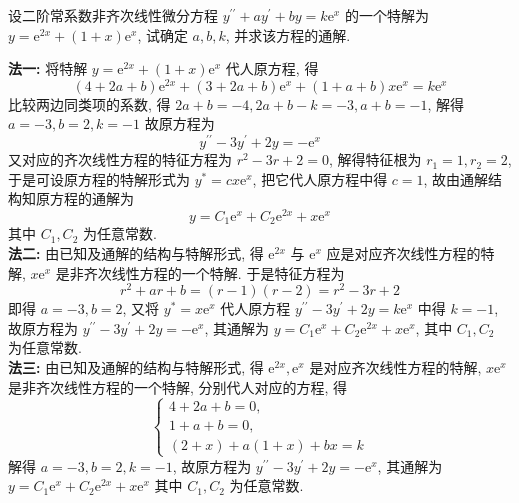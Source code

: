 \begin{example}[1993 数三]
    设二阶常系数非齐次线性微分方程 $ y^{\prime \prime}+a y^{\prime}+b y=k \mathrm{e}^{x} $ 的一个特解为 $ y=\mathrm{e}^{2 x}+(1+x) \mathrm{e}^{x} $, 试确定 $ a, b, k $, 并求该方程的通解.
\end{example}
\begin{solution}
    \textbf{法一: }
    将特解 $ y=\mathrm{e}^{2 x}+(1+x) \mathrm{e}^{x} $ 代人原方程, 得
    $$(4+2 a+b) \mathrm{e}^{2 x}+(3+2 a+b) \mathrm{e}^{x}+(1+a+b) x \mathrm{e}^{x}=k \mathrm{e}^{x} $$
    比较两边同类项的系数, 得 $ 2 a+b=-4,2 a+b-k=-3, a+b=-1 $, 解得 $ a=-3 , b=2, k=-1 $ 故原方程为
    $$y^{\prime \prime}-3 y^{\prime}+2 y=-\mathrm{e}^{x} $$
    又对应的齐次线性方程的特征方程为 $ r^{2}-3 r+2=0 $, 解得特征根为 $ r_{1}=1, r_{2}=2 $, 于是可设原方程的特解形式为 $ y^{*}=c x \mathrm{e}^{x} $, 把它代人原方程中得 $ c=1 $, 故由通解结构知原方程的通解为 $$ y=C_{1} \mathrm{e}^{x}+C_{2} \mathrm{e}^{2 x}+x \mathrm{e}^{x}$$ 其中 $ C_{1}, C_{2} $ 为任意常数.\\
    \textbf{法二: }
    由已知及通解的结构与特解形式, 得 $ \mathrm{e}^{2 x} $ 与 $ \mathrm{e}^{x} $ 应是对应齐次线性方程的特解, $ x \mathrm{e}^{x} $ 是非齐次线性方程的一个特解. 于是特征方程为 $$ r^{2}+a r+b=(r-1)(r-2)=r^{2}-3 r+2$$
    即得 $ a=-3, b=2$, 又将 $ y^{*}=x \mathrm{e}^{x} $ 代人原方程 $ y^{\prime \prime}-3 y^{\prime}+2 y=k \mathrm{e}^{x} $ 中得 $ k=-1$, 故原方程为 $ y^{\prime \prime}-3 y^{\prime}+2 y=-\mathrm{e}^{x} $, 其通解为 $ y=C_{1} \mathrm{e}^{x}+C_{2} \mathrm{e}^{2 x}+x \mathrm{e}^{x} $, 其中 $ C_{1}, C_{2} $ 为任意常数.\\
    \textbf{法三: }由已知及通解的结构与特解形式, 得 $ \mathrm{e}^{2 x}, \mathrm{e}^{x} $ 是对应齐次线性方程的特解, $ x \mathrm{e}^{x} $ 是非齐次线性方程的一个特解, 分别代人对应的方程, 得
    $$ \begin{cases}
            4+2 a+b=0, \\ 1+a+b=0, \\ (2+x)+a(1+x)+b x=k
        \end{cases}$$
    解得 $ a=-3, b=2, k=-1 $, 故原方程为 $ y^{\prime \prime}-3 y^{\prime}+   2 y=-\mathrm{e}^{x} $, 其通解为 $ y=C_{1} \mathrm{e}^{x}+C_{2} \mathrm{e}^{2 x}+x \mathrm{e}^{x} $ 其中 $ C_{1}, C_{2} $ 为任意常数.
\end{solution}

